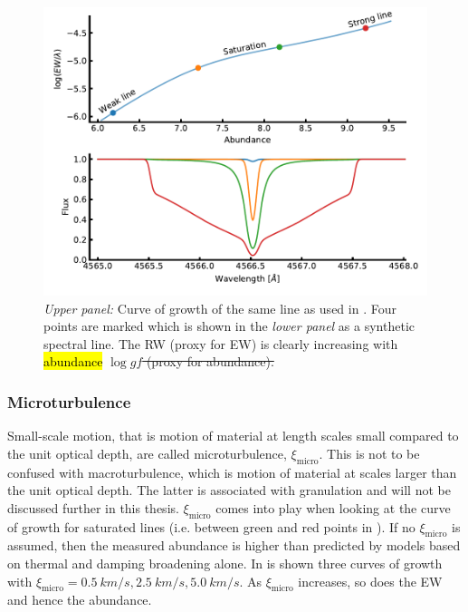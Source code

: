 \begin{figure}[htpb!]
    \centering
    \includegraphics[width=0.85\linewidth]{figures/cog.pdf}
    \caption{\emph{Upper panel:} Curve of growth of the same  line as used in
                                 . Four points are marked which is shown in the
             \emph{lower panel} as a synthetic spectral line. The RW (proxy for EW) is clearly
                                increasing with \hl{abundance} \st{$\log \mathit{gf}$ (proxy for abundance).}}
    \label{fig:cog}
\end{figure}


\subsubsection{Microturbulence}

Small-scale motion, that is motion of material at length scales small compared to the unit optical
depth, are called microturbulence, $\xi_\mathrm{micro}$. This is not to be confused with
macroturbulence, which is motion of material at scales larger than the unit optical depth. The
latter is associated with granulation and will not be discussed further in this thesis.
$\xi_\mathrm{micro}$ comes into play when looking at the curve of growth for saturated lines (i.e.
between green and red points in ). If no $\xi_\mathrm{micro}$ is assumed, then the
measured abundance is higher than predicted by models based on thermal and damping broadening alone.
In  is shown three curves of growth with $\xi_\mathrm{micro}={\SI{0.5}{km/s},
\SI{2.5}{km/s}, \SI{5.0}{km/s}}$. As $\xi_\mathrm{micro}$ increases, so does the EW and hence the
abundance.

